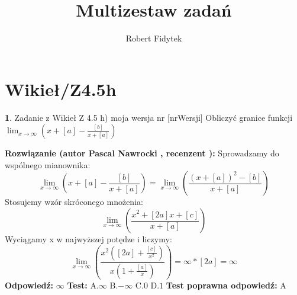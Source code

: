 \documentclass[12pt, a4paper]{article}
\title{Multizestaw zadań}
\author{Robert Fidytek}
\date{}
\theoremstyle{definition} %
\newtheorem{zad}{}
\newcommand{\kategoria}[1]{\section{#1}} %
\newcommand{\zadStart}[1]{\begin{zad}#1\newline} %
\newcommand{\zadStop}{\end{zad}}   %
\newcommand{\rozwStart}[2]{\noindent \textbf{Rozwiązanie (autor #1 , recenzent #2): }\newline} %
\newcommand{\rozwStop}{\newline}                                            %
\newcommand{\odpStart}{\noindent \textbf{Odpowiedź:}\newline}    %
\newcommand{\odpStop}{\newline}                                             %
\newcommand{\testStart}{\noindent \textbf{Test:}\newline} %
\newcommand{\testStop}{\newline} %
\newcommand{\kluczStart}{\noindent \textbf{Test poprawna odpowiedź:}\newline} %
\newcommand{\kluczStop}{\newline} %
\begin{document}
\maketitle


\kategoria{Wikieł/Z4.5h}
\zadStart{Zadanie z Wikieł Z 4.5 h) moja wersja nr [nrWersji]}
Obliczyć granice funkcji $\displaystyle{\lim_{x \to \infty}}(x+[a]-\frac{[b]}{x+[a]})$
\zadStop
\rozwStart{Pascal Nawrocki}{}
Sprowadzamy do wspólnego mianownika:
$$\displaystyle{\lim_{x \to \infty}}(x+[a]-\frac{[b]}{x+[a]})=\displaystyle{\lim_{x \to \infty}}(\frac{(x+[a])^2-[b]}{x+[a]})$$
Stosujemy wzór skróconego mnożenia:
$$\displaystyle{\lim_{x \to \infty}}(\frac{x^2+[2a]x+[c]}{x+[a]})$$
Wyciągamy x w najwyższej potędze i liczymy:
$$\displaystyle{\lim_{x \to \infty}}(\frac{x^2([2a]+\frac{[c]}{x^2})}{x(1+\frac{[a]}{x})})=\infty*[2a]=\infty$$
\rozwStop
\odpStart
$\infty$
\odpStop
\testStart
A.$\infty$
B.$-\infty$
C.$0$
D.$1$
\testStop
\kluczStart
A
\kluczStop
\end{document}
